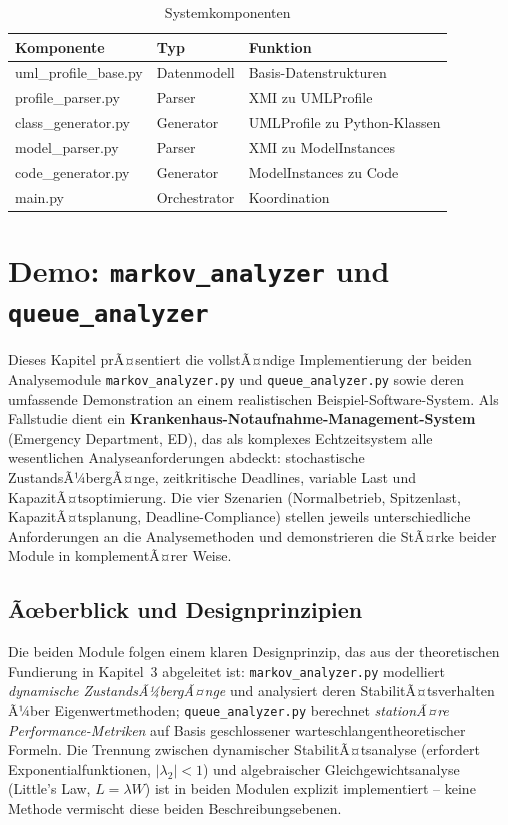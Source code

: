 ﻿\documentclass[a4paper,12pt]{scrreprt}
\theoremstyle{definition}
\begin{document}
\begin{table}[h]
	\centering
	\begin{tabular}{@{}llp{5cm}@{}}
		\toprule
		\textbf{Komponente} & \textbf{Typ} & \textbf{Funktion} \\
		\midrule
		uml\_profile\_base.py & Datenmodell & Basis-Datenstrukturen \\
		profile\_parser.py & Parser & XMI zu UMLProfile \\
		class\_generator.py & Generator & UMLProfile zu Python-Klassen \\
		model\_parser.py & Parser & XMI zu ModelInstances \\
		code\_generator.py & Generator & ModelInstances zu Code \\
		main.py & Orchestrator & Koordination \\
		\bottomrule
	\end{tabular}
	\caption{Systemkomponenten}
	\label{tab:components}
\end{table}


\section{Demo: \texttt{markov\_analyzer} und \texttt{queue\_analyzer}}
\label{sec:demo}

Dieses Kapitel prÃ¤sentiert die vollstÃ¤ndige Implementierung der beiden
Analysemodule \texttt{markov\_analyzer.py} und \texttt{queue\_analyzer.py}
sowie deren umfassende Demonstration an einem realistischen Beispiel-Software-System.
Als Fallstudie dient ein \textbf{Krankenhaus-Notaufnahme-Management-System}
(Emergency Department, ED), das als komplexes Echtzeitsystem alle wesentlichen
Analyseanforderungen abdeckt: stochastische ZustandsÃ¼bergÃ¤nge, zeitkritische
Deadlines, variable Last und KapazitÃ¤tsoptimierung. Die vier Szenarien
(Normalbetrieb, Spitzenlast, KapazitÃ¤tsplanung, Deadline-Compliance) stellen
jeweils unterschiedliche Anforderungen an die Analysemethoden und demonstrieren
die StÃ¤rke beider Module in komplementÃ¤rer Weise.

\subsection{Ãœberblick und Designprinzipien}

Die beiden Module folgen einem klaren Designprinzip, das aus der
theoretischen Fundierung in Kapitel~3 abgeleitet ist:
\texttt{markov\_analyzer.py} modelliert \emph{dynamische ZustandsÃ¼bergÃ¤nge}
und analysiert deren StabilitÃ¤tsverhalten Ã¼ber Eigenwertmethoden;
\texttt{queue\_analy\newline zer.py} berechnet \emph{stationÃ¤re Performance-Metriken}
auf Basis geschlossener warteschlangentheoretischer Formeln.
Die Trennung zwischen dynamischer StabilitÃ¤tsanalyse
(erfordert Exponentialfunktionen, $|\lambda_2| < 1$) und algebraischer
Gleichgewichtsanalyse (Little's Law, $L = \lambda W$) ist in beiden Modulen
explizit implementiert -- keine Methode vermischt diese beiden Beschreibungsebenen.
\end{document}
